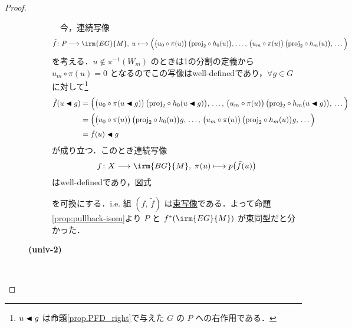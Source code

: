 \documentclass[TQFT_main]{subfiles}
\begin{document}
\begin{proof}
\begin{description}
\begin{description}
            　今，連続写像
            \begin{align}
                \tilde{f} \colon P \lto \irm{EG}{M},\; u \lmto \Bigl( \bigl(u_0 \circ \pi(u)\bigr)\, \bigl( \mathrm{proj}_2 \circ h_0(u) \bigr),\, \dots,\, \bigl(u_m \circ \pi(u)\bigr)\, \bigl( \mathrm{proj}_2 \circ h_m(u) \bigr),\, \dots  \Bigr) 
            \end{align}
            を考える．$u \notin \pi^{-1}(W_m)$ のときは1の分割の定義から $u_m \circ \pi (u) = 0$ となるのでこの写像はwell-definedであり，$\forall g \in G$ に対して\footnote{$u \blacktriangleleft g$ は命題\ref{prop.PFD_right}で与えた $G$ の $P$ への右作用である．}
            \begin{align}
                \tilde{f}(u \blacktriangleleft g)
                &= \Bigl( \bigl(u_0 \circ \pi(u \blacktriangleleft g)\bigr)\, \bigl( \mathrm{proj}_2 \circ h_0(u \blacktriangleleft g) \bigr),\, \dots,\, \bigl(u_m \circ \pi(u)\bigr)\, \bigl( \mathrm{proj}_2 \circ h_m(u \blacktriangleleft g) \bigr),\, \dots  \Bigr) \\
                &= \Bigl( \bigl(u_0 \circ \pi(u)\bigr)\, \bigl( \mathrm{proj}_2 \circ h_0(u) \bigr)g,\, \dots,\, \bigl(u_m \circ \pi(u)\bigr)\, \bigl( \mathrm{proj}_2 \circ h_m(u) \bigr)g,\, \dots  \Bigr) \\
                &= \tilde{f}(u) \blacktriangleleft g
            \end{align}
            が成り立つ．このとき連続写像
            \begin{align}
                f \colon X \lto \irm{BG}{M},\; \pi(u) \lmto p \bigl( \tilde{f}(u) \bigr) 
            \end{align}
            はwell-definedであり，図式
            \begin{center}
            \end{center}
            を可換にする．i.e. 組 $(f,\, \tilde{f})$ は\hyperref[def.bundlemap]{束写像}である．よって命題\ref{prop:pullback-isom}より $P$ と $f^*(\irm{EG}{M})$ が束同型だと分かった．
            
            \item[\textbf{(univ-2)}]　
            

        \end{description}
        
    \end{description}
    
\end{proof}
\end{document}
